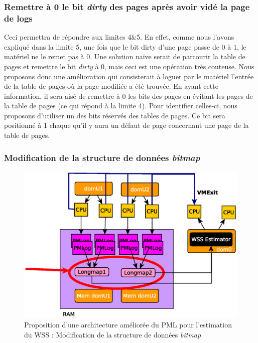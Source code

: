 \subsubsection{Remettre à 0 le bit \textit{dirty} des pages après avoir vidé la page de logs}
Ceci permettra de répondre aux limites 4\&5. En effet, comme nous l'avons expliqué dans la limite 5, une fois que le bit dirty d'une page passe de 0 à 1, le matériel ne le remet pas à 0. Une solution naïve serait de parcourir la table de pages et remettre le bit \textit{dirty} à 0, mais ceci est une opération très couteuse. Nous proposons donc une amélioration qui consisterait à loguer par le matériel l'entrée de la table de pages où la page modifiée a été trouvée. En ayant cette information, il sera aisé de remettre à 0 les bits des pages en évitant les pages de la table de pages (ce qui répond à la limite 4). Pour identifier celles-ci, nous proposons d'utiliser un des bits réservés des tables de pages. Ce bit sera positionné à 1 chaque qu'il y aura un défaut de page concernant une page de la table de pages.

\subsubsection{Modification de la structure de données \textit{bitmap}}
\begin{figure}[H]
    \centering
    \includegraphics[scale=.8]{chapters/3/fig3/PMLOverview3}
    \caption{Proposition d'une architecture améliorée du PML pour l'estimation du WSS : Modification de la structure de données \textit{bitmap}}
    \label{fig:bitmap}
\end{figure}

